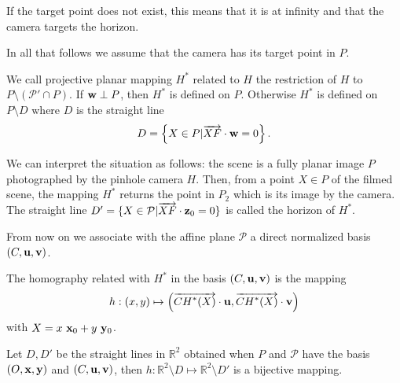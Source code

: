 \begin{remarque}
If the target point does not exist, this means that it is at infinity and that the camera targets the horizon.
\end{remarque}


In all that follows we assume that the camera has its target point in $P$.

\begin{Def}
We call projective planar mapping $H^*$ related to $H$ the restriction of $H$ to $P\setminus (\mathcal{P}'\cap P)$. 
If $\mathbf{w} \perp P $, then $H^*$ is defined on $P$. Otherwise $H^*$ is defined on $P\setminus D$ where $D$ is the straight line
\begin{equation*}
D=\left\{ X\in P | \overrightarrow{XF}\cdot \mathbf{w} = 0\right\}.
\end{equation*}
\end{Def}

\begin{remarques}
We can interpret the situation as follows: the scene is a fully planar image $P$ photographed by the pinhole camera $H$.  Then, from a point $X\in P$ of the filmed scene, the mapping $H^*$ returns the point in $P_2$ which is its image by the camera. The straight line $D'=\{ X \in \mathcal{P} | \overrightarrow{XF} \cdot \mathbf{z}_0 =0 \}$ is called the horizon of $H^*$.
\end{remarques}

From now on we associate with the affine plane $\mathcal{P}$ a direct normalized basis $(C,\mathbf{u},\mathbf{v})$. 

\begin{Def}
 The homography related with $H^*$ in the basis $(C,\mathbf{u},\mathbf{v})$ is the mapping
\begin{equation}
h : (x,y)  \mapsto \left( \overrightarrow{CH^*(X)}\cdot \mathbf{u} , \overrightarrow{CH^*(X)}\cdot \mathbf{v} \right)
\label{formule_homographie_H}
\end{equation}
with $X=x~\mathbf{x}_0 + y~\mathbf{y}_0 $.
\label{def_homographie_H}
\end{Def}

Let $D,D'$ be the straight lines in $\mathbb{R}^2$ obtained when $P$ and $\mathcal{P}$ have the basis $(O,\mathbf{x},\mathbf{y})$ and $(C,\mathbf{u},\mathbf{v})$, then $h:\mathbb{R}^2  \setminus D \mapsto \mathbb{R}^2  \setminus D'$ is a bijective mapping.



